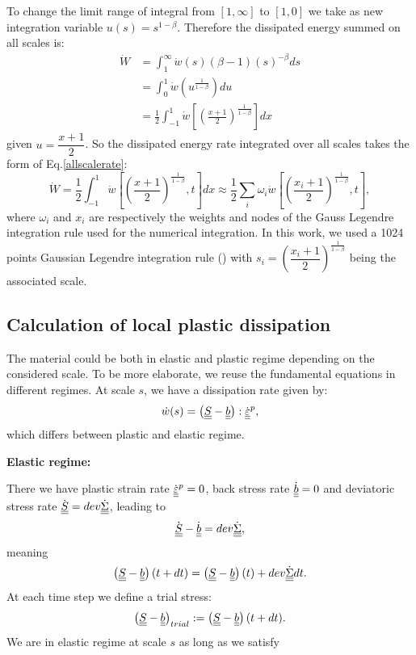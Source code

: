 \noindent
To change the limit range of integral from $[1,\infty]$ to $[1,0]$ we take as new integration variable
$u(s)= s^{1-\beta}$. Therefore the dissipated energy summed on all scales is:
\begin{equation}
\begin{split}
\dot{W}&=\int_{1}^{\infty}\dot{w}(s) (\beta-1)(s)^{-\beta}ds
\\&=\int_{0}^{1}\dot{w}\left( u^{\frac{1}{1-\beta}}\right)du
\\&=\frac{1}{2}\int_{-1}^{1}\dot{w}\left[  \left( \frac{x+1}{2}\right) ^{\frac{1}{1-\beta}}\right] dx
\end{split}
\label{allscale}
\end{equation}
given $u=\dfrac{x+1}{2}$. So the dissipated energy rate integrated over all scales takes the form of Eq.\eqref{allscalerate}:
\begin{equation}
\dot{W}=\frac{1}{2}\int_{-1}^{1}\dot{w}\left[  \left( \frac{x+1}{2}\right) ^{\frac{1}{1-\beta}},t\right] dx\approx\frac{1}{2}\sum_{i}\omega_i\dot{w}\left[  \left( \frac{x_i+1}{2}\right) ^{\frac{1}{1-\beta}},t\right],
\label{allscalerate}
\end{equation}
where $\omega_i$ and $x_i$ are respectively the weights and nodes of the Gauss Legendre integration rule used for the numerical integration.  In this work, we used a 1024 points Gaussian Legendre integration rule (\cite{Legendre}) with $s_i=\left( \dfrac{x_i+1}{2}\right) ^{\frac{1}{1-\beta}}$ being the associated scale.

\subsection{Calculation of local plastic dissipation}
\label{sec:5.4.4}
The material could be both in elastic and plastic regime depending on the considered scale. To be more elaborate, we reuse the fundamental equations in different regimes. At scale $s$, we have a dissipation rate given by:
$$\dot{w}(s)=\left( \uline{\uline{S}}-\uline{\uline{b}}\right):\dot{\uline{\uline{\varepsilon}}}^p, $$
which differs between plastic and elastic regime.

\vspace{6pt}
\noindent
\textbf{Elastic regime:}

\vspace{6pt}
\noindent
There we have
plastic strain rate
$\dot{\uline{\uline{\varepsilon}}}^p=0$, back stress rate $\dot{\uline{\uline{b}}}=0$ and deviatoric stress rate $\dot{\uline{\uline{S}}}=dev\dot{\uline{\uline{\Sigma}}}$, leading to
$$\dot{\uline{\uline{S}}}-\dot{\uline{\uline{b}}}=dev\dot{\uline{\uline{\Sigma}}},$$ 
meaning
$$\left( \uline{\uline{S}}-\uline{\uline{b}}\right) (t+dt)=\left( \uline{\uline{S}}-\uline{\uline{b}}\right) (t)+dev\dot{\uline{\uline{\Sigma}}}dt.$$
At each time step we define a trial stress:
\begin{equation}
\left( \uline{\uline{S}}-\uline{\uline{b}}\right)_{trial}:=\left( \uline{\uline{S}}-\uline{\uline{b}}\right)(t+dt).
\label{trial}
\end{equation}
We are in elastic regime at scale $s$ as long as we satisfy

